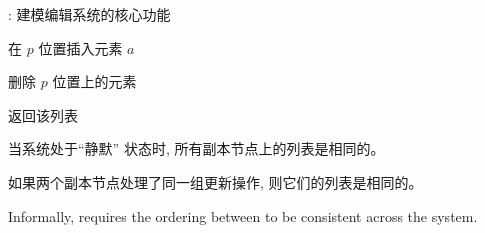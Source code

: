 \begin{frame}{}
  \centerline{\Large {}: 建模编辑系统的核心功能}
  \vspace{0.30cm}

  \begin{center}
    \begin{minipage}{0.70\textwidth}
      \begin{description}
	\setlength{\itemsep}{10pt}
	\item[$\textsc{Ins}(a, p):$] 在 $p$ 位置插入元素 $a$
	\item[$\textsc{Del}(p):$] 删除 $p$ 位置上的元素
	\item[$\textsc{Read}:$] 返回该列表
      \end{description}
    \end{minipage}
  \end{center}
\end{frame}

\begin{frame}{}
  \begin{cdef}
    当系统处于``静默''  状态时, 所有副本节点上的列表是相同的。
  \end{cdef}

  \vspace{0.30cm}
  \begin{cdef}
    如果两个副本节点处理了同一组更新操作, 则它们的列表是相同的。
  \end{cdef}

  \pause
  \vspace{0.60cm}
  \centerline{}
\end{frame}

\begin{frame}{}

  \vspace{0.20cm}
  \begin{cdef}
    Informally, \wlspec{} requires the ordering between  to be consistent across the system.
  \end{cdef}

  \vspace{0.60cm}
  \centerline{}
\end{frame}


